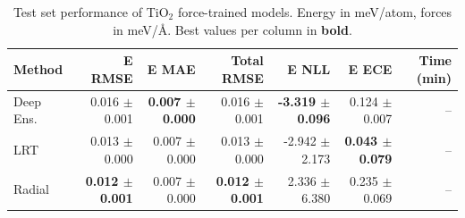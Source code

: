 \begin{table}
\centering
\caption{Test set performance of TiO$_2$ force-trained models. Energy in meV/atom, forces in meV/\AA{}. Best values per column in \textbf{bold}.}
\label{tab:tio2_results}
\begin{tabular}{lrrrrrr}
\toprule
Method & E RMSE & E MAE & Total RMSE & E NLL & E ECE & Time (min) \\
\midrule
Deep Ens. & 0.016 $\pm$ 0.001 & \textbf{0.007 $\pm$ 0.000} & 0.016 $\pm$ 0.001 & \textbf{-3.319 $\pm$ 0.096} & 0.124 $\pm$ 0.007 & -- \\
LRT & 0.013 $\pm$ 0.000 & 0.007 $\pm$ 0.000 & 0.013 $\pm$ 0.000 & -2.942 $\pm$ 2.173 & \textbf{0.043 $\pm$ 0.079} & -- \\
Radial & \textbf{0.012 $\pm$ 0.001} & 0.007 $\pm$ 0.000 & \textbf{0.012 $\pm$ 0.001} & 2.336 $\pm$ 6.380 & 0.235 $\pm$ 0.069 & -- \\
\bottomrule
\end{tabular}
\end{table}